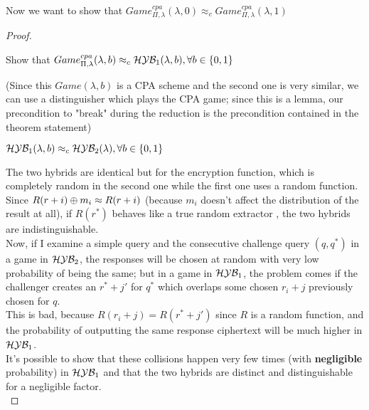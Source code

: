 Now we want to show that $Game_{\Pi, \lambda}^{cpa}(\lambda,0)
\approx_{c}Game_{\Pi, \lambda}^{cpa}(\lambda,1) $
\begin{proof}

    \begin{exercise}
        \begin{lemma}
        Show that $Game_{\Pi, \lambda}^{cpa}(\lambda,b) \approx_{c} \mathcal{H}\mathcal{Y}\mathcal{B}_{1}
        (\lambda, b), \forall b \in \{0,1\} $
        \end{lemma}

        (Since this $Game(\lambda, b)$ is a CPA scheme and the second one is        very similar, we can use a distinguisher which plays the CPA game; since this is a lemma, our precondition to "break" during the reduction is the precondition contained in the theorem statement)
    \end{exercise}

    \begin{lemma}
        $\mathcal{H}\mathcal{Y}\mathcal{B}_{1}(\lambda,b) \approx_{c} \mathcal{H}\mathcal{Y}\mathcal{B}_{2} (\lambda), \forall b \in
        \{0,1\}$
    \end{lemma}

    The two hybrids are identical but for the encryption function, which is
    completely random in the second one while the first one uses a random
    function.\\
    
    Since  $R(r + i ) \oplus m_{i} \approx R(r + i ) $ (because
    $m_{i}$ doesn't affect the distribution of the result at all), if  $R(r^{*})$ 
     behaves like a true random extractor , the two hybrids are
    indistinguishable.\\

    Now, if I examine a simple query and the consecutive challenge query $(q,
    q^{*})$ in a game in $\mathcal{H}\mathcal{Y}\mathcal{B}_{2}$, the responses will be chosen at random
    with very low probability of being the same; but in a game in
    $\mathcal{H}\mathcal{Y}\mathcal{B}_{1}$, the problem comes if the challenger 
    creates an $r^{*}+ j'$ for $q^{*}$ which overlaps some chosen
    $r_{i} + j$ previously chosen for $q$.\\
    This is bad, because $R(r_{i} + j)=R(r^{*} + j')$ since $R$ is a random
    function, and the probability of outputting the same response ciphertext
    will be much higher in $\mathcal{H}\mathcal{Y}\mathcal{B}_{1}$.\\

    It's possible to show that these collisions happen very few times
    (with \textbf{negligible} probability) in $\mathcal{H}\mathcal{Y}\mathcal{B}_{1}$ and  that the two 
    hybrids are distinct and
    distinguishable for a negligible factor.\\


\end{proof}
